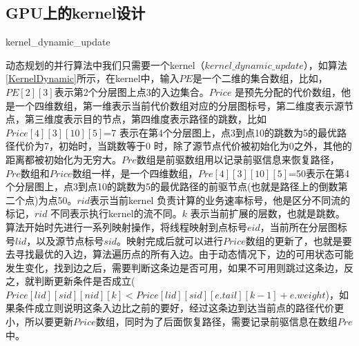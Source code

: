 \subsection{GPU上的kernel设计}
\begin{algorithm}[t]
\begin{algorithmic}[1]
\EndIf
\EndIf
\EndFor
\EndFunction
\end{algorithmic}
\caption{kernel\_dynamic\_update}
\label{KernelDynamic}
\end{algorithm}

动态规划的并行算法中我们只需要一个kernel（$kernel\_dynamic\_update$），如算法\ref{KernelDynamic}所示，在kernel中，输入$PE$是一个二维的集合数组，比如，$PE[2][3]$表示第2个分层图上点3的入边集合。$Price$ 是预先分配的代价数组，他是一个四维数组，第一维表示当前代价数组对应的分层图标号，第二维度表示源节点，第三维度表示目的节点，第四维度表示路径的跳数，比如$Price[4][3][10][5]$=7 表示在第4个分层图上，点3到点10的跳数为5的最优路径代价为7，初始时，当跳数等于0 时，除了源节点代价被初始化为0之外，其他的距离都被初始化为无穷大。$Pre$数组是前驱数组用以记录前驱信息来恢复路径，$Pre$数组和$Price$数组一样，是一个四维数组，$Pre[4][3][10][5]$=50表示在第4个分层图上，点3到点10的跳数为5的最优路径的前驱节点(也就是路径上的倒数第二个点)为点50。$rid$表示当前kernel 负责计算的业务速率标号，他是区分不同流的标记，$rid$ 不同表示执行kernel的流不同。$k$ 表示当前扩展的层数，也就是跳数。算法开始时先进行一系列映射操作，将线程映射到点标号$eid$，当前所在分层图标号$lid$，以及源节点标号$sid$。映射完成后就可以进行$Price$数组的更新了，也就是要去寻找最优的入边，算法遍历点的所有入边。由于动态情况下，边的可用状态可能发生变化，找到边之后，需要判断这条边是否可用，如果不可用则跳过这条边，反之，就判断更新条件是否成立($Price[lid][sid][nid][k]<Price[lid][sid][e.tail][k-1]+e.weight$)，如果条件成立则说明这条入边比之前的要好，经过这条边到达当前点的路径代价更小，所以要更新$Price$数组，同时为了后面恢复路径，需要记录前驱信息在数组$Pre$中。

